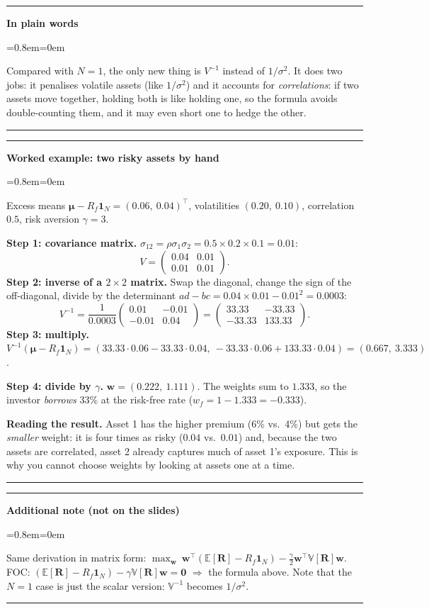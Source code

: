 \documentclass[11pt,a4paper]{report}
\newenvironment{notebox}[1]
  {\par\medskip\Needspace{6\baselineskip}\noindent\rule{\linewidth}{0.4pt}\par\nopagebreak
   \noindent\textbf{#1}\par\nopagebreak
   \begin{list}{}{\leftmargin=0.8em\rightmargin=0em\topsep=2pt}\item[]}
  {\end{list}\nopagebreak\noindent\rule{\linewidth}{0.4pt}\par\medskip}
\newenvironment{plainbox}{\begin{notebox}{In plain words}}{\end{notebox}}
\newenvironment{addnote}{\begin{notebox}{Additional note (not on the slides)}}{\end{notebox}}
\newenvironment{workedex}[1][]{\begin{notebox}{Worked example#1}}{\end{notebox}}
\newcommand{\E}{\mathbb{E}}
\newcommand{\V}{\mathbb{V}}
\newcommand{\one}{\mathbf{1}_N}
\newcommand{\w}{\bm{w}}
\newcommand{\R}{\bm{R}}
\newcommand{\T}{^{\top}}
\newcommand{\Rf}{R_f}
\newcommand{\mub}{\bm{\mu}}
\begin{document}
\begin{plainbox}
Compared with $N=1$, the only new thing is $V^{-1}$ instead of $1/\sigma^2$. It
does two jobs: it penalises volatile assets (like $1/\sigma^2$) and it accounts
for \emph{correlations}: if two assets move together, holding both is like holding
one, so the formula avoids double-counting them, and it may even short one to
hedge the other.
\end{plainbox}

\begin{workedex}[: two risky assets by hand]
Excess means $\mub-R_f\one=(0.06,\ 0.04)\T$, volatilities $(0.20,\ 0.10)$,
correlation $0.5$, risk aversion $\gamma=3$.

\textbf{Step 1: covariance matrix.} $\sigma_{12}=\rho\sigma_1\sigma_2=0.5\times0.2\times0.1=0.01$:
\[
V=\begin{pmatrix}0.04&0.01\\0.01&0.01\end{pmatrix}.
\]
\textbf{Step 2: inverse of a $2\times2$ matrix.} Swap the diagonal, change the
sign of the off-diagonal, divide by the determinant $ad-bc=0.04\times0.01-0.01^2=0.0003$:
\[
V^{-1}=\frac{1}{0.0003}\begin{pmatrix}0.01&-0.01\\-0.01&0.04\end{pmatrix}
=\begin{pmatrix}33.33&-33.33\\-33.33&133.33\end{pmatrix}.
\]
\textbf{Step 3: multiply.}
$V^{-1}(\mub-R_f\one)=(33.33\cdot0.06-33.33\cdot0.04,\ -33.33\cdot0.06+133.33\cdot0.04)=(0.667,\ 3.333)$.

\textbf{Step 4: divide by $\gamma$.} $\w=(0.222,\ 1.111)$. The weights sum to
$1.333$, so the investor \emph{borrows} 33\% at the risk-free rate
($w_f=1-1.333=-0.333$).

\textbf{Reading the result.} Asset 1 has the higher premium (6\% vs.\ 4\%) but gets
the \emph{smaller} weight: it is four times as risky ($0.04$ vs.\ $0.01$) and,
because the two assets are correlated, asset 2 already captures much of asset 1's
exposure. This is why you cannot choose weights by looking at assets one at a time.
\end{workedex}
\begin{addnote}
Same derivation in matrix form:
$\max_{\w}\ \w\T(\E[\R]-\Rf\one)-\frac{\gamma}{2}\w\T\V[\R]\w$.
FOC: $(\E[\R]-\Rf\one)-\gamma\V[\R]\w=\bm 0$ $\Rightarrow$ the formula above.
Note that the $N=1$ case is just the scalar version: $\V^{-1}$ becomes $1/\sigma^2$.
\end{addnote}
\end{document}
